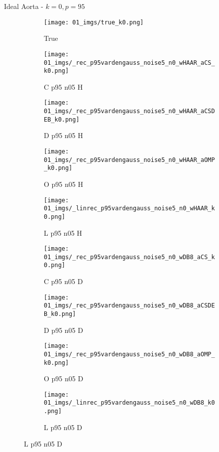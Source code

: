 \begin{frame}{Ideal Aorta - $k=0,p=95$}{}
\begin{figure}
\begin{subfigure}{0.1\textwidth}
\texttt{[image: 01\_imgs/true\_k0.png]}
\caption*{\Tiny True}
\end{subfigure}
\begin{subfigure}{0.1\textwidth}
\texttt{[image: 01\_imgs/\_rec\_p95vardengauss\_noise5\_n0\_wHAAR\_aCS\_k0.png]}
\caption*{\Tiny C p95 n05 H}
\end{subfigure}
\begin{subfigure}{0.1\textwidth}
\texttt{[image: 01\_imgs/\_rec\_p95vardengauss\_noise5\_n0\_wHAAR\_aCSDEB\_k0.png]}
\caption*{\Tiny D p95 n05 H}
\end{subfigure}
\begin{subfigure}{0.1\textwidth}
\texttt{[image: 01\_imgs/\_rec\_p95vardengauss\_noise5\_n0\_wHAAR\_aOMP\_k0.png]}
\caption*{\Tiny O p95 n05 H}
\end{subfigure}
\begin{subfigure}{0.1\textwidth}
\texttt{[image: 01\_imgs/\_linrec\_p95vardengauss\_noise5\_n0\_wHAAR\_k0.png]}
\caption*{\Tiny L p95 n05 H}
\end{subfigure}
\begin{subfigure}{0.1\textwidth}
\texttt{[image: 01\_imgs/\_rec\_p95vardengauss\_noise5\_n0\_wDB8\_aCS\_k0.png]}
\caption*{\Tiny C p95 n05 D}
\end{subfigure}
\begin{subfigure}{0.1\textwidth}
\texttt{[image: 01\_imgs/\_rec\_p95vardengauss\_noise5\_n0\_wDB8\_aCSDEB\_k0.png]}
\caption*{\Tiny D p95 n05 D}
\end{subfigure}
\begin{subfigure}{0.1\textwidth}
\texttt{[image: 01\_imgs/\_rec\_p95vardengauss\_noise5\_n0\_wDB8\_aOMP\_k0.png]}
\caption*{\Tiny O p95 n05 D}
\end{subfigure}
\begin{subfigure}{0.1\textwidth}
\texttt{[image: 01\_imgs/\_linrec\_p95vardengauss\_noise5\_n0\_wDB8\_k0.png]}
\caption*{\Tiny L p95 n05 D}
\end{subfigure}

\vspace{5pt}


\end{figure}
\end{frame}
